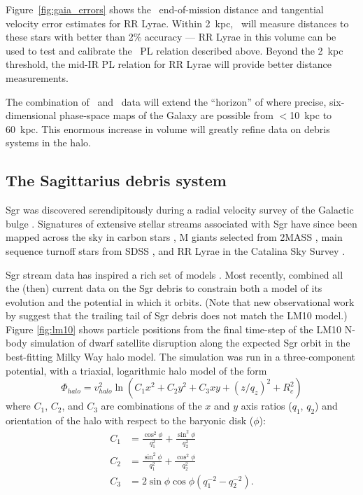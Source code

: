 Figure~\ref{fig:gaia_errors} shows the \gaia\ end-of-mission distance and
tangential velocity error estimates for RR Lyrae. Within 2~kpc, \gaia\ will
measure distances to these stars with better than 2\% accuracy --- RR Lyrae in
this volume can be used to test and calibrate the \spitzer\ PL relation
described above. Beyond the 2~kpc threshold, the mid-IR PL relation for RR Lyrae
will provide better distance measurements.

The combination of \spitzer\ and \gaia\ data will extend the ``horizon''
of where precise, six-dimensional phase-space maps of the Galaxy are possible
from $<$10~kpc to 60~kpc. This enormous increase in volume will greatly refine
data on debris systems in the halo.

\subsection{The Sagittarius debris system}
\label{sec:ch2-sgr}
Sgr was discovered serendipitously during a radial velocity survey of the
Galactic bulge \citep{ibata94}. Signatures of extensive stellar streams
associated with Sgr have since  been mapped across the sky in carbon stars
\citep{totten98}, M giants selected from 2MASS \citep{majewski03}, main sequence
turnoff stars from SDSS \citep{belokurov06}, and RR Lyrae in the Catalina Sky
Survey \citep{drake13}.

Sgr stream data has inspired a rich set of models \citep[e.g.,][]{johnston99b,
fellhauer06}. Most recently, \citet[][hereafter LM10]{law10} combined all the
(then) current data on the Sgr debris to constrain both a model of its evolution
and the potential in which it orbits. (Note that new observational work by
\citet{belokurov13} suggest that the trailing tail of Sgr debris does not
match the LM10 model.) Figure \ref{fig:lm10} shows particle positions from the
final time-step of the LM10 N-body simulation of dwarf satellite disruption
along the expected Sgr orbit in the best-fitting Milky Way halo model. The
simulation was run in a three-component potential, with a triaxial, logarithmic
halo model of the form
\begin{equation}
  \Phi_{halo} = v_{halo}^2 \ln(C_1 x^2 + C_2 y^2 + C_3 xy + (z/q_z)^2 + R_c^2)
\end{equation}
where $C_1$, $C_2$, and $C_3$ are combinations of the $x$ and $y$ axis ratios
($q_1$, $q_2$) and orientation of the halo with respect to the baryonic disk
($\phi$):
\begin{align}
  C_1 &= \frac{\cos^2\phi}{q_1^2} + \frac{\sin^2\phi}{q_2^2}\\
  C_2 &= \frac{\sin^2\phi}{q_1^2} + \frac{\cos^2\phi}{q_2^2}\\
  C_3 &= 2\sin\phi\cos\phi \left(q_1^{-2} - q_2^{-2}\right).
\end{align}

